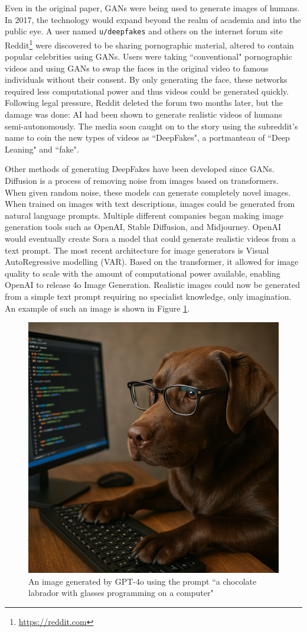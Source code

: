Even in the original paper, GANs were being used to generate images of humans\cite{goodfellow2014generative}. In 2017, the technology would expand beyond the realm of academia and into the public eye. A user named \verb|u/deepfakes| and others on the internet forum site Reddit\footnote{\url{https://reddit.com}} were discovered to be sharing pornographic material, altered to contain popular celebrities using GANs\cite{cole2018reddit}. Users were taking ``conventional" pornographic videos and using GANs to swap the faces in the original video to famous individuals without their consent. By only generating the face, these networks required less computational power and thus videos could be generated quickly. Following legal pressure, Reddit deleted the forum two months later\cite{cole2018reddit}, but the damage was done: AI had been shown to generate realistic videos of humans semi-autonomously. The media soon caught on to the story using the subreddit's name to coin the new types of videos as ``DeepFakes", a portmanteau of ``Deep Leaning" and ``fake".

Other methods of generating DeepFakes have been developed since GANs. Diffusion\cite{rombach2022high} is a process of removing noise from images based on transformers\cite{vaswani2017attention}. When given random noise, these models can generate completely novel images. When trained on images with text descriptions, images could be generated from natural language prompts. Multiple different companies began making image generation tools such as OpenAI\cite{ramesh2022hierarchical}, Stable Diffusion\cite{stablediffusion2022}, and Midjourney\cite{midjourney2022}. OpenAI would eventually create Sora\cite{brooks2024video} a model that could generate realistic videos from a text prompt. The most recent architecture for image generators is Visual AutoRegressive modelling (VAR)\cite{tian2024visual}. Based on the transformer, it allowed for image quality to scale with the amount of computational power available, enabling OpenAI to release 4o Image Generation\cite{4oimagegen}. Realistic images could now be generated from a simple text prompt requiring no specialist knowledge, only imagination. An example of such an image is shown in Figure \ref{fig:gpt4o-dog}.

\begin{figure}[h]
    \centering
    \includegraphics[width=0.5\linewidth]{dissertation//figures/gpt4o.png}
    \caption{An image generated by GPT-4o\cite{4oimagegen} using the prompt ``a chocolate labrador with glasses programming on a computer"}
    \label{fig:gpt4o-dog}
\end{figure}

